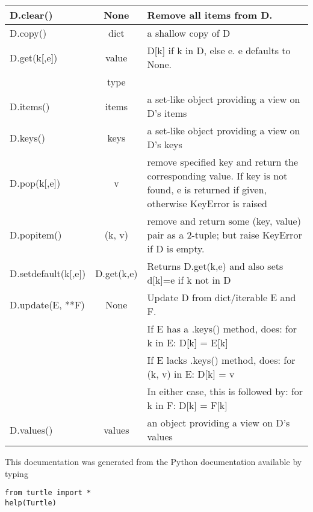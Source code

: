 \begin{center}
{\begin{tabular}{|l|c|p{2.8in}|}
    D.clear() &  None &   Remove all items from D. \\ \hline
   
    D.copy() & dict & a shallow copy of D\\ \hline
   
       D.get(k[,e]) & value & D[k] if k in D, else e.  e defaults to None.\\
       & type & \\ \hline   

       D.items() & items &  a set-like object providing a view on D's items\\ \hline

       D.keys() & keys & a set-like object providing a view on D's keys\\ \hline
   

       D.pop(k[,e]) &  v & remove specified key and return the corresponding value.
       If key is not found, e is returned if given, otherwise KeyError is raised\\ \hline
   

       D.popitem() &  (k, v) & remove and return some (key, value) pair as a
       2-tuple; but raise KeyError if D is empty.\\ \hline
   


       D.setdefault(k[,e]) & D.get(k,e) &  Returns D.get(k,e) and also sets d[k]=e if k not in D\\ \hline
   

       D.update(E, **F) &  None & Update D from dict/iterable E and F.\\
    & &    If E has a .keys() method, does:     for k in E: D[k] = E[k]\\
     & &  If E lacks .keys() method, does:     for (k, v) in E: D[k] = v\\
     & &  In either case, this is followed by: for k in F: D[k] = F[k]\\ \hline

       D.values() & values &  an object providing a view on D's values\\ \hline
\end{tabular}}
\end{center}

This documentation was generated from the Python documentation available by typing 


\begin{lstlisting}
from turtle import *
help(Turtle)
\end{lstlisting}

